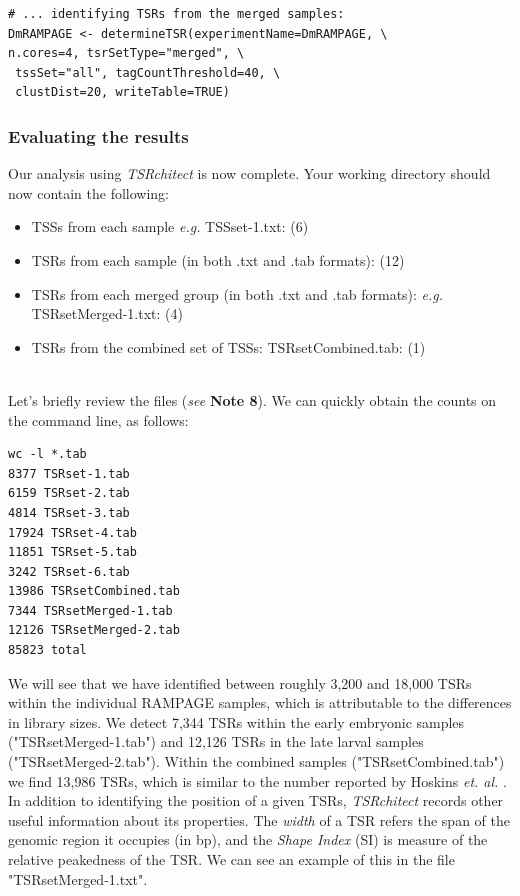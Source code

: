 \documentclass[runningheads,a4paper]{llncs}
\begin{document}
\begin{linenumbers}
\begin{verbatim}
# ... identifying TSRs from the merged samples:
DmRAMPAGE <- determineTSR(experimentName=DmRAMPAGE, \
n.cores=4, tsrSetType="merged", \
 tssSet="all", tagCountThreshold=40, \
 clustDist=20, writeTable=TRUE)
\end{verbatim}

\subsubsection{Evaluating the results}
Our analysis using \textit{TSRchitect} is now complete.
Your working directory should now contain the following: 
\begin{itemize}
\item TSSs from each sample \textit{e.g.} TSSset-1.txt: (6)
\item TSRs from each sample (in both .txt and .tab formats): (12)
\item TSRs from each merged group (in both .txt and .tab formats): \textit{e.g.} TSRsetMerged-1.txt: (4)
\item TSRs from the combined set of TSSs: TSRsetCombined.tab: (1)
\end{itemize} \\

\noindent
Let's briefly review the files (\textit{see} \textbf{Note 8}). 
We can quickly obtain the counts on the command line, as follows:

\noindent
\begin{verbatim}
wc -l *.tab
8377 TSRset-1.tab
6159 TSRset-2.tab
4814 TSRset-3.tab
17924 TSRset-4.tab
11851 TSRset-5.tab
3242 TSRset-6.tab
13986 TSRsetCombined.tab
7344 TSRsetMerged-1.tab
12126 TSRsetMerged-2.tab
85823 total
\end{verbatim}

\noindent
We will see that we have identified between roughly 3,200 and 18,000 TSRs within the individual RAMPAGE samples, which is attributable to the differences in library sizes. 
We detect 7,344 TSRs within the early embryonic samples ("TSRsetMerged-1.tab") and 12,126 TSRs in the late larval samples ("TSRsetMerged-2.tab").
Within the combined samples ("TSRsetCombined.tab") we find 13,986 TSRs, which is similar to the number reported by Hoskins \textit{et. al.} \cite{Hoskins:2011io}.\\

\noindent
In addition to identifying the position of a given TSRs, \textit{TSRchitect} records other useful information about its properties.
The \textit{width} of a TSR refers the span of the genomic region it occupies (in bp), and the \textit{Shape Index} (SI) is measure of the relative peakedness of the TSR.
We can see an example of this in the file "TSRsetMerged-1.txt".


\end{linenumbers}
\end{document}
